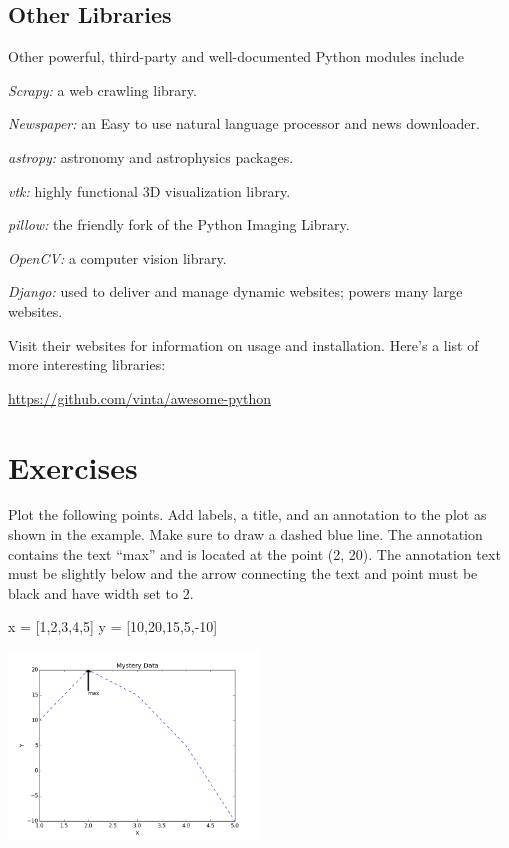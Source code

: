 \documentclass[11pt]{cselabheader}
\begin{document}
\subsection{Other Libraries}
Other powerful, third-party and well-documented Python modules include
\begin{inparaenum}
\item \textsl{Scrapy:} a web crawling library.
\item \textsl{Newspaper:} an Easy to use natural language processor and news downloader.
\item \textsl{astropy:} astronomy and astrophysics packages.
\item \textsl{vtk:} highly functional 3D visualization library.
\item \textsl{pillow:} the friendly fork of the Python Imaging Library.
\item \textsl{OpenCV:} a computer vision library.
\item \textsl{Django:} used to deliver and manage dynamic websites; powers many large websites.
\end{inparaenum}

Visit their websites for information on usage and installation.
Here's a list of more interesting libraries:
\begin{center}
\url{https://github.com/vinta/awesome-python}
\end{center}

\section{Exercises}
\begin{ex}[plotpoints.py]
Plot the following points. Add labels, a title, and an annotation to the plot
as shown in the example. Make sure to draw a dashed blue line.
The annotation contains the text ``max'' and is located at the point (2, 20).
The annotation text must be slightly below and the arrow connecting the text
and point must be black and have width set to 2.

\begin{python3code}
x = [1,2,3,4,5]
y = [10,20,15,5,-10]
\end{python3code}

\begin{center}
\includegraphics[width=0.5\textwidth]{img/basic.png}
\end{center}
\end{ex}
\end{document}
